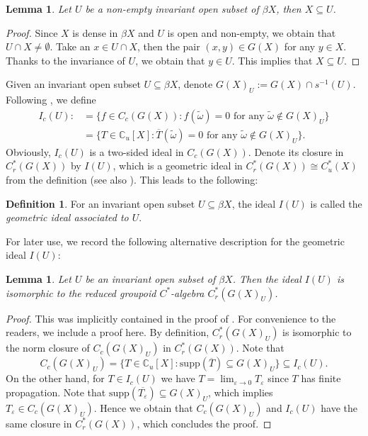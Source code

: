 \documentclass[12pt, a4paper]{amsart}
\numberwithin{equation}{section}
\newtheorem{lem}[thm]{Lemma}
\theoremstyle{definition}
\newtheorem{defn}[thm]{Definition}
\theoremstyle{remark}
\def\CC{\mathbb{C}}
\def\supp{\mathrm{supp}}
\begin{document}
\begin{lem}\label{lem: inv. open contains X}
Let $U$ be a non-empty invariant open subset of $\beta X$, then $X \subseteq U$. 
\end{lem}

\begin{proof}
Since $X$ is dense in $\beta X$ and $U$ is open and non-empty, we obtain that $U \cap X \neq \emptyset$. Take an $x \in U \cap X$, then the pair $(x,y) \in G(X)$ for any $y\in X$. Thanks to the invariance of $U$, we obtain that $y\in U$. This implies that $X \subseteq U$.
\end{proof}


Given an invariant open subset $U \subseteq \beta X$, denote $G(X)_U:=G(X) \cap s^{-1}(U)$. Following \cite{CW04}, we define
\begin{align*}
I_c(U):&=\{f\in C_c(G(X)): f(\tilde{\omega})=0 \mbox{~for~any~} \tilde{\omega} \notin G(X)_U\}\\
&= \{T \in \CC_u[X]: \overline{T}(\tilde{\omega})=0 \mbox{~for~any~} \tilde{\omega} \notin G(X)_U\}.
\end{align*}
Obviously, $I_c(U)$ is a two-sided ideal in $C_c(G(X))$. Denote its closure in $C^*_r(G(X))$ by $I(U)$, which is a geometric ideal in $C^*_r(G(X)) \cong C^*_u(X)$ from the definition (see also \cite[Lemma 5.1]{CW04}). This leads to the following:

\begin{defn}\label{defn:geometric ideal}
For an invariant open subset $U \subseteq \beta X$, the ideal $I(U)$ is called the \emph{geometric ideal associated to $U$}.
\end{defn}


For later use, we record the following alternative description for the geometric ideal $I(U)$:

\begin{lem}\label{lem: groupoid C*-alg char for I(U)}
Let $U$ be an invariant open subset of $\beta X$. Then the ideal $I(U)$ is isomorphic to the reduced groupoid $C^*$-algebra $C^*_r(G(X)_U)$.
\end{lem}

\begin{proof}
This was implicitly contained in the proof of \cite[Proposition 5.5]{CW04}. For convenience to the readers, we include a proof here. By definition, $C^*_r(G(X)_U)$ is isomorphic to the norm closure of $C_c(G(X)_U)$ in $C^*_r(G(X))$. Note that
\[
C_c(G(X)_U) = \{T \in \CC_u[X]: \supp(\overline{T}) \subseteq G(X)_U\} \subseteq I_c(U). 
\]
On the other hand, for $T \in I_c(U)$ we have $T = \lim_{\varepsilon \to 0} T_\varepsilon$ since $T$ has finite propagation. Note that $\supp(\overline{T_\varepsilon}) \subseteq G(X)_U$, which implies $T_\varepsilon \in C_c(G(X)_U)$. Hence we obtain that $C_c(G(X)_U)$ and $I_c(U)$ have the same closure in $C^*_r(G(X))$, which concludes the proof.
\end{proof}
\end{document}
